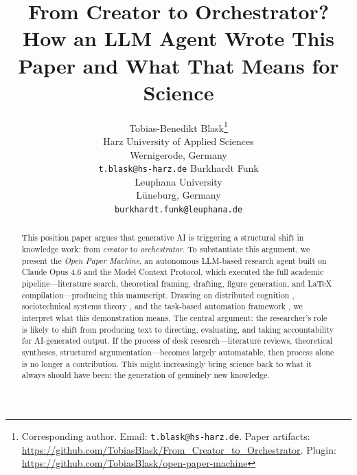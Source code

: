 \documentclass{article}
\title{From Creator to Orchestrator? How an LLM Agent Wrote This Paper
and What That Means for Science}
\author{
  Tobias-Benedikt Blask\thanks{Corresponding author. Email: \texttt{t.blask@hs-harz.de}. Paper artifacts: \url{https://github.com/TobiasBlask/From_Creator_to_Orchestrator}. Plugin: \url{https://github.com/TobiasBlask/open-paper-machine}}\\
  Harz University of Applied Sciences\\
  Wernigerode, Germany\\
  \texttt{t.blask@hs-harz.de}
  \And
  Burkhardt Funk\\
  Leuphana University\\
  L\"uneburg, Germany\\
  \texttt{burkhardt.funk@leuphana.de}
}
\date{}
\begin{document}
\raggedbottom

\maketitle

\noindent{}

\vspace{1em}


\begin{abstract}
This position paper argues that generative AI is triggering a structural shift in knowledge work: from \textit{creator} to \textit{orchestrator}. To substantiate this argument, we present the \textit{Open Paper Machine}, an autonomous LLM-based research agent built on Claude Opus 4.6 and the Model Context Protocol, which executed the full academic pipeline---literature search, theoretical framing, drafting, figure generation, and \LaTeX{} compilation---producing this manuscript. Drawing on distributed cognition \citep{hutchins1995cognition}, sociotechnical systems theory \citep{trist1951social}, and the task-based automation framework \citep{autor2015why}, we interpret what this demonstration means. The central argument: the researcher's role is likely to shift from producing text to directing, evaluating, and taking accountability for AI-generated output. If the process of desk research---literature reviews, theoretical syntheses, structured argumentation---becomes largely automatable, then process alone is no longer a contribution. This might increasingly bring science back to what it always should have been: the generation of genuinely new knowledge.
\end{abstract}
\end{document}
